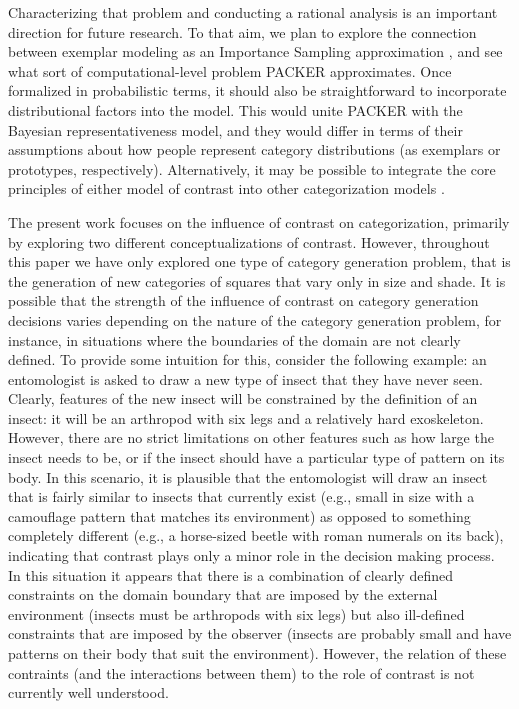 \documentclass[12pt]{article}
\begin{document}
\begin{flushleft}
Characterizing that problem and conducting a rational analysis is an important
direction for future research. To that aim, we plan to explore the connection
between exemplar modeling as an Importance Sampling approximation
\citep{shi10exemplar}, and see what sort of computational-level problem PACKER
approximates. Once formalized in probabilistic terms, it should also be
straightforward to incorporate distributional factors into the model. This would
unite PACKER with the Bayesian representativeness model, and they would differ
in terms of their assumptions about how people represent category distributions
(as exemplars or prototypes, respectively). Alternatively, it may be possible to
integrate the core principles of either model of contrast into other
categorization models
\citep[e.g.,][]{love2004sustain,kurtz2007divergent,smith2000thirty}.

The present work focuses on the influence of contrast on categorization,
primarily by exploring two different conceptualizations of contrast. However,
throughout this paper we have only explored one type of category generation
problem, that is the generation of new categories of squares that vary only in
size and shade. It is possible that the strength of the influence of contrast on
category generation decisions varies depending on the nature of the category
generation problem, for instance, in situations where the boundaries of the
domain are not clearly defined. To provide some intuition for this, consider the
following example: an entomologist is asked to draw a new type of insect that
they have never seen. Clearly, features of the new insect will be constrained by
the definition of an insect: it will be an arthropod with six legs and a
relatively hard exoskeleton. However, there are no strict limitations on other
features such as how large the insect needs to be, or if the insect should have
a particular type of pattern on its body. In this scenario, it is plausible that
the entomologist will draw an insect that is fairly similar to insects that
currently exist (e.g., small in size with a camouflage pattern that matches its
environment) as opposed to something completely different (e.g., a horse-sized
beetle with roman numerals on its back), indicating that contrast plays only a
minor role in the decision making process. In this situation it appears that
there is a combination of clearly defined constraints on the domain boundary
that are imposed by the external environment (insects must be arthropods with
six legs) but also ill-defined constraints that are imposed by the observer
(insects are probably small and have patterns on their body that suit the
environment). However, the relation of these contraints (and the interactions
between them) to the role of contrast is not currently well understood.


\end{flushleft}
\end{document}
